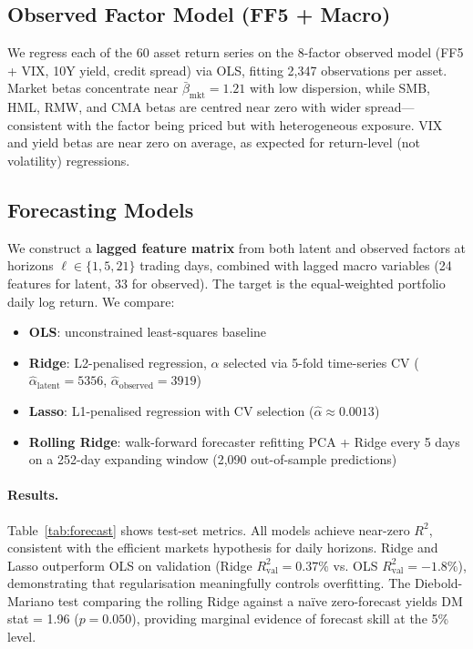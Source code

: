 \documentclass{article}
\begin{document}
\subsection{Observed Factor Model (FF5 + Macro)}

We regress each of the 60 asset return series on the 8-factor observed model (FF5 + VIX, 10Y
yield, credit spread) via OLS, fitting 2,347 observations per asset. Market betas concentrate near
$\bar\beta_{\text{mkt}} = 1.21$ with low dispersion, while SMB, HML, RMW, and CMA betas are
centred near zero with wider spread---consistent with the factor being priced but with heterogeneous
exposure. VIX and yield betas are near zero on average, as expected for return-level (not volatility)
regressions.

\subsection{Forecasting Models}

We construct a \textbf{lagged feature matrix} from both latent and observed factors at horizons
$\ell \in \{1, 5, 21\}$ trading days, combined with lagged macro variables (24 features for latent,
33 for observed). The target is the equal-weighted portfolio daily log return. We compare:

\begin{itemize}
  \item \textbf{OLS}: unconstrained least-squares baseline
  \item \textbf{Ridge}: L2-penalised regression, $\alpha$ selected via 5-fold time-series CV
        ($\hat\alpha_{\text{latent}} = 5356$, $\hat\alpha_{\text{observed}} = 3919$)
  \item \textbf{Lasso}: L1-penalised regression with CV selection ($\hat\alpha \approx 0.0013$)
  \item \textbf{Rolling Ridge}: walk-forward forecaster refitting PCA + Ridge every 5 days on a
        252-day expanding window (2,090 out-of-sample predictions)
\end{itemize}

\paragraph{Results.} Table~\ref{tab:forecast} shows test-set metrics. All models achieve near-zero
$R^2$, consistent with the efficient markets hypothesis for daily horizons. Ridge and Lasso
outperform OLS on validation (Ridge $R^2_{\text{val}} = 0.37\%$ vs. OLS $R^2_{\text{val}} = -1.8\%$),
demonstrating that regularisation meaningfully controls overfitting. The Diebold-Mariano test
comparing the rolling Ridge against a na\"ive zero-forecast yields DM stat = 1.96 ($p = 0.050$),
providing marginal evidence of forecast skill at the 5\% level.
\end{document}
